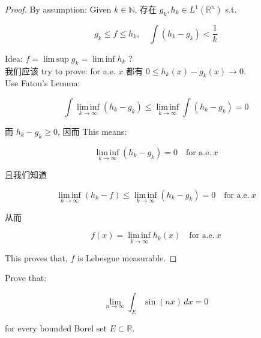 \documentclass{qlnotes-export}
\begin{document}
\begin{proof}

By assumption: Given \(k \in {\mathbb{N}}\), 存在 \(g_{k},h_{k} \in L^{1}({\mathbb{R}}^{n})\) s.t.

\[g_{k} \leq f \leq h_{k},\quad\int(h_{k} - g_{k}) < \frac{1}{k}\]

Idea: \(f = \operatorname{lim\, sup}g_{k} = \operatorname{lim\, inf}h_{k}\) ?\\
我们应该 try to prove: for a.e. \(x\) 都有 \(0 \leq h_{k}(x) - g_{k}(x)\rightarrow 0\).\\
Use Fatou's Lemma:

\[\int\operatorname{lim\, inf}\limits_{k\rightarrow\infty}(h_{k} - g_{k}) \leq \operatorname{lim\, inf}\limits_{k\rightarrow\infty}\int(h_{k} - g_{k}) = 0\]

而 \(h_{k} - g_{k} \geq 0\), 因而 This means:

\[\operatorname{lim\, inf}\limits_{k\rightarrow\infty}(h_{k} - g_{k}) = 0\quad\text{for a.e.}\ x\]

且我们知道

\[\operatorname{lim\, inf}\limits_{k\rightarrow\infty}(h_{k} - f) \leq \operatorname{lim\, inf}\limits_{k\rightarrow\infty}(h_{k} - g_{k}) = 0\quad\text{for a.e.}\ x\]

从而

\[f(x) = \operatorname{lim\, inf}\limits_{k\rightarrow\infty}h_{k}(x)\quad\text{for a.e.}\ x\]

This proves that, \(f\) is Lebesgue measurable.

\end{proof}

\begin{example}

Prove that:

\[\lim\limits_{n\rightarrow\infty}\int_{E}\sin(nx)\, dx = 0\]

for every bounded Borel set \(E \subset {\mathbb{R}}\).\\

\end{example}
\end{document}
